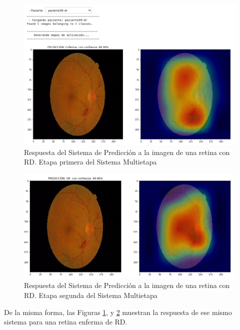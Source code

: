 \documentclass[
  12pt,
  spanish,
  a4paperpaper,
]{report}
\begin{document}
\begin{figure}
\centering
\includegraphics[width=1\textwidth,height=\textheight]{source/figures/pred3.png}
\caption{Respuesta del Sistema de Predicción a la imagen de una retina
con RD. Etapa primera del Sistema Multietapa \label{pred3}}
\end{figure}

\begin{figure}
\centering
\includegraphics[width=1\textwidth,height=\textheight]{source/figures/pred4.png}
\caption{Respuesta del Sistema de Predicción a la imagen de una retina
con RD. Etapa segunda del Sistema Multietapa \label{pred4}}
\end{figure}

De la misma forma, las Figuras \ref{pred3}, y \ref{pred4} muestran la
respuesta de ese mismo sistema para una retina enferma de RD.
\end{document}
